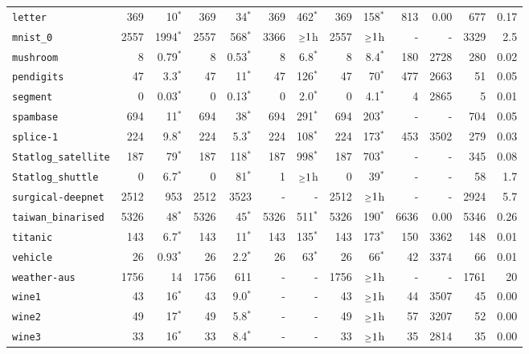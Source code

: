 \begin{tabular}{lrrrrrrrrrrrr}
\texttt{letter} & 369 & 10$^*$ & 369 & 34$^*$ & 369 & 462$^*$ & 369 & 158$^*$ & 813 & 0.00 & 677 & 0.17\\
\texttt{mnist\_0} & 2557 & 1994$^*$ & 2557 & 568$^*$ & 3366 & $\mathsmaller{\geq}1$h & 2557 & $\mathsmaller{\geq}1$h & - & - & 3329 & 2.5\\
\texttt{mushroom} & 8 & 0.79$^*$ & 8 & 0.53$^*$ & 8 & 6.8$^*$ & 8 & 8.4$^*$ & 180 & 2728 & 280 & 0.02\\
\texttt{pendigits} & 47 & 3.3$^*$ & 47 & 11$^*$ & 47 & 126$^*$ & 47 & 70$^*$ & 477 & 2663 & 51 & 0.05\\
\texttt{segment} & 0 & 0.03$^*$ & 0 & 0.13$^*$ & 0 & 2.0$^*$ & 0 & 4.1$^*$ & 4 & 2865 & 5 & 0.01\\
\texttt{spambase} & 694 & 11$^*$ & 694 & 38$^*$ & 694 & 291$^*$ & 694 & 203$^*$ & - & - & 704 & 0.05\\
\texttt{splice-1} & 224 & 9.8$^*$ & 224 & 5.3$^*$ & 224 & 108$^*$ & 224 & 173$^*$ & 453 & 3502 & 279 & 0.03\\
\texttt{Statlog\_satellite} & 187 & 79$^*$ & 187 & 118$^*$ & 187 & 998$^*$ & 187 & 703$^*$ & - & - & 345 & 0.08\\
\texttt{Statlog\_shuttle} & 0 & 6.7$^*$ & 0 & 81$^*$ & 1 & $\mathsmaller{\geq}1$h & 0 & 39$^*$ & - & - & 58 & 1.7\\
\texttt{surgical-deepnet} & 2512 & 953 & 2512 & 3523 & - & - & 2512 & $\mathsmaller{\geq}1$h & - & - & 2924 & 5.7\\
\texttt{taiwan\_binarised} & 5326 & 48$^*$ & 5326 & 45$^*$ & 5326 & 511$^*$ & 5326 & 190$^*$ & 6636 & 0.00 & 5346 & 0.26\\
\texttt{titanic} & 143 & 6.7$^*$ & 143 & 11$^*$ & 143 & 135$^*$ & 143 & 173$^*$ & 150 & 3362 & 148 & 0.01\\
\texttt{vehicle} & 26 & 0.93$^*$ & 26 & 2.2$^*$ & 26 & 63$^*$ & 26 & 66$^*$ & 42 & 3374 & 66 & 0.01\\
\texttt{weather-aus} & 1756 & 14 & 1756 & 611 & - & - & 1756 & $\mathsmaller{\geq}1$h & - & - & 1761 & 20\\
\texttt{wine1} & 43 & 16$^*$ & 43 & 9.0$^*$ & - & - & 43 & $\mathsmaller{\geq}1$h & 44 & 3507 & 45 & 0.00\\
\texttt{wine2} & 49 & 17$^*$ & 49 & 5.8$^*$ & - & - & 49 & $\mathsmaller{\geq}1$h & 57 & 3207 & 52 & 0.00\\
\texttt{wine3} & 33 & 16$^*$ & 33 & 8.4$^*$ & - & - & 33 & $\mathsmaller{\geq}1$h & 35 & 2814 & 35 & 0.00\\
\bottomrule
\end{tabular}
